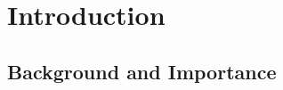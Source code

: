 \documentclass{sfuthesis}
\begin{document}
%
\listoffigures%
\clearpage





%
%

\mainmatter

\chapter{Introduction}
\section{Background and Importance}
\end{document}
